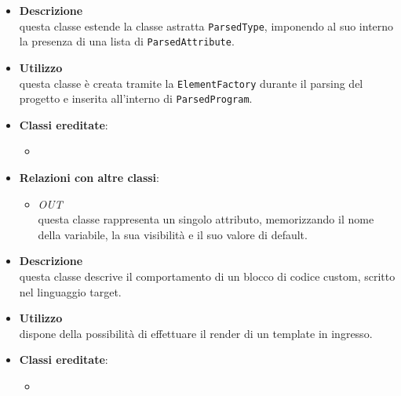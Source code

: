 \label{\nogloxy{swedesigner::server::project::ParsedClass}}
\begin{itemize}
\item \textbf{Descrizione}\\
questa classe estende la classe astratta \texttt{ParsedType}, imponendo al suo interno la presenza di una lista di \texttt{ParsedAttribute}. 
\item \textbf{Utilizzo}\\
questa classe è creata tramite la \texttt{ElementFactory} durante il parsing del progetto e inserita all'interno di \texttt{ParsedProgram}.
\item \textbf{Classi ereditate}:
\begin{itemize}
\item \hyperref[\nogloxy{swedesigner::server::project::ParsedType}]{}
\end{itemize}
\item \textbf{Relazioni con altre classi}:
\begin{itemize}
\item \textit{OUT} \hyperref[\nogloxy{swedesigner::server::project::ParsedAttribute}]{}\\
questa classe rappresenta un singolo attributo, memorizzando il nome della variabile, la sua visibilità e il suo valore di default. 
\end{itemize}
\end{itemize}

\label{\nogloxy{swedesigner::server::project::ParsedCustom}}
\begin{itemize}
\item \textbf{Descrizione}\\
questa classe descrive il comportamento di un blocco di codice custom, scritto nel linguaggio target.	
\item \textbf{Utilizzo}\\
dispone della possibilità di effettuare il render di un template in ingresso.
\item \textbf{Classi ereditate}:
\begin{itemize}
\item \hyperref[\nogloxy{swedesigner::server::project::ParsedInstruction}]{}
\end{itemize}
\end{itemize}

